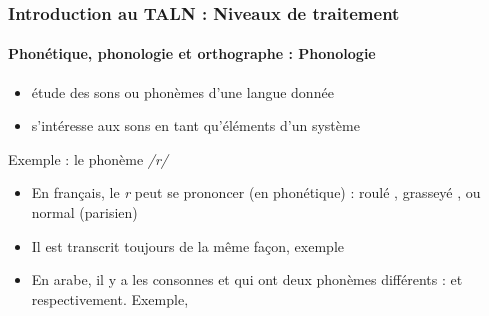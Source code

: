 \documentclass[xcolor=table]{beamer}
\begin{document}
\begin{frame}
\frametitle{Introduction au TALN : Niveaux de traitement}
\framesubtitle{Phonétique, phonologie et orthographe : Phonologie}

\begin{itemize}
	\item étude des sons ou phonèmes d'une langue donnée
	\item s'intéresse aux sons en tant qu'éléments d'un système
\end{itemize}

\begin{exampleblock}{Exemple : le phonème \textit{/r/}}
	\begin{itemize}
		\item En français, le \textit{r} peut se prononcer (en phonétique) : roulé \expword{\textipa{[r]}}, grasseyé \expword{\textipa{[\;R]}}, ou normal (parisien) \expword{\textipa{[K]}}
		\item Il est transcrit toujours de la même façon, exemple 
		\item En arabe, il y a les consonnes  et  qui ont deux phonèmes différents :  et  respectivement. 
		Exemple, 
	\end{itemize}
\end{exampleblock}

\end{frame}
\end{document}
